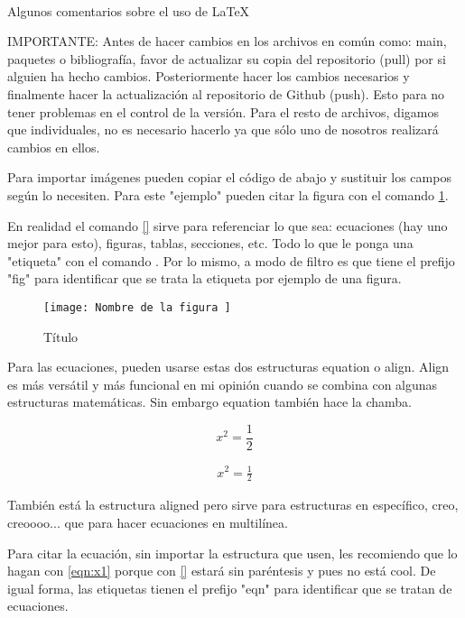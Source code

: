 \\ Algunos comentarios sobre el uso de LaTeX

IMPORTANTE: 
Antes de hacer cambios en los archivos en común como: main, paquetes o bibliografía,
favor de actualizar su copia del repositorio (pull) por si alguien ha hecho cambios.
Posteriormente hacer los cambios necesarios y finalmente hacer la actualización
al repositorio de Github (push). Esto para no tener problemas en el control 
de la versión. Para el resto de archivos, digamos que individuales, no es necesario 
hacerlo ya que sólo uno de nosotros realizará cambios en ellos. 

Para importar imágenes pueden copiar el código de abajo y sustituir
los campos según lo necesiten. Para este "ejemplo" pueden citar la 
figura con el comando \ref{fig:flores}. 

En realidad el comando \ref{} sirve para referenciar lo que sea: 
ecuaciones (hay uno mejor para esto), figuras, tablas, secciones, etc. 
Todo lo que le ponga una "etiqueta" con el comando \label{}. Por lo mismo,
a modo de filtro es que tiene el prefijo "fig" para identificar que 
se trata la etiqueta por ejemplo de una figura. 

\begin{figure}[H]
    \texttt{[image:  Nombre de la figura ]}
    \centering
    \caption{ Título }
    \label{fig:flores}
\end{figure}

Para las ecuaciones, pueden usarse estas dos estructuras {equation} o {align}.
{Align} es más versátil y más funcional en mi opinión cuando se combina con 
algunas estructuras matemáticas. Sin embargo {equation} también hace la chamba. 

\begin{equation}
    \label{eqn:x1}
    x^2 = \frac{1}{2}
\end{equation}

\begin{align}
    \label{eqn:x2}
    x^2 = \frac{1}{2}
\end{align}

También está la estructura {aligned} pero sirve para estructuras en específico,
creo, creoooo... que para hacer ecuaciones en multilínea. 

Para citar la ecuación, sin importar la estructura que usen, les recomiendo que lo 
hagan con \eqref{eqn:x1} porque con \ref{} estará sin paréntesis y pues no está 
cool. De igual forma, las etiquetas tienen el prefijo "eqn" para identificar 
que se tratan de ecuaciones. 

